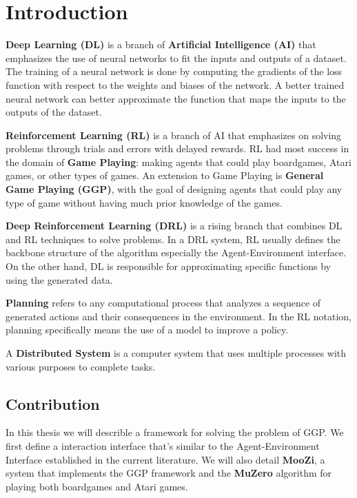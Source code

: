 \documentclass[12pt]{article}
\newcommand{\note}[1]{\todo[color=yellow!40,bordercolor=none,linecolor=black]{~~ #1}}
\begin{document}

\section{Introduction}

\note{8 - 10 pages of introduction}

\textbf{Deep Learning (DL)} is a branch of \textbf{Artificial Intelligence (AI)} that emphasizes the use of neural networks to fit the inputs and outputs of a dataset.
The training of a neural network is done by computing the gradients of the loss function with respect to the weights and biases of the network.
A better trained neural network can better approximate the function that maps the inputs to the outputs of the dataset.

\textbf{Reinforcement Learning (RL)} is a branch of AI that emphasizes on solving problems through trials and errors with delayed rewards.
RL had most success in the domain of \textbf{Game Playing}: making agents that could play boardgames, Atari games, or other types of games.
An extension to Game Playing is \textbf{General Game Playing (GGP)}, with the goal of designing agents that could play any type of game without having much prior knowledge of the games.
\note{discuss policy}

\textbf{Deep Reinforcement Learning (DRL)} is a rising branch that combines DL and RL techniques to solve problems.
In a DRL system, RL usually defines the backbone structure of the algorithm especially the Agent-Environment interface.
On the other hand, DL is responsible for approximating specific functions by using the generated data.

\textbf{Planning} refers to any computational process that analyzes a sequence of generated actions and their consequences in the environment.
In the RL notation, planning specifically means the use of a model to improve a policy.

A \textbf{Distributed System} is a computer system that uses multiple processes with various purposes to complete tasks.

\subsection{Contribution}
In this thesis we will describle a framework for solving the problem of GGP.
We first define a interaction interface that's similar to the Agent-Environment Interface established in the current literature.
We will also detail \textbf{MooZi}, a system that implements the GGP framework and the \textbf{MuZero} algorithm for playing both boardgames and Atari games.
\end{document}
